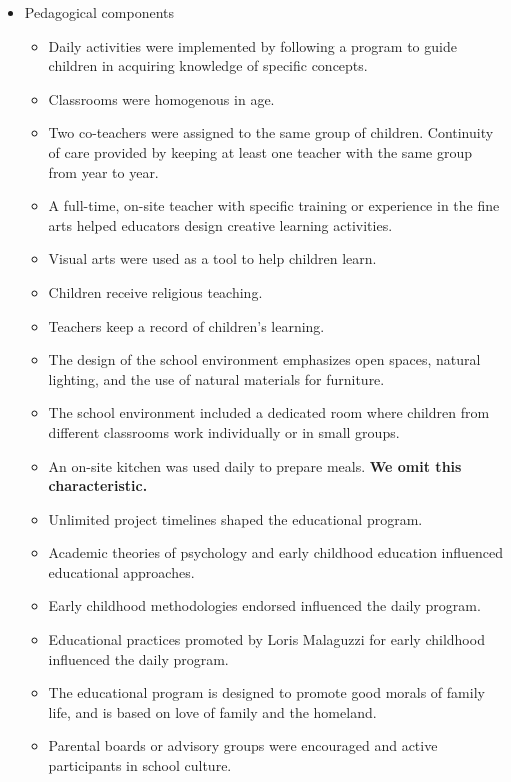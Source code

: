\begin{itemize}
\item Pedagogical components
\begin{itemize}
	\item Daily activities were implemented by following a program to guide children in acquiring knowledge of specific concepts.
	\item Classrooms were homogenous in age.
	\item Two co-teachers were assigned to the same group of children. Continuity of care provided by keeping at least one teacher with the same group from year to year.
	\item A full-time, on-site teacher with specific training or experience in the fine arts helped educators design creative learning activities.
	\item Visual arts were used as a tool to help children learn.
	\item Children receive religious teaching.
	\item Teachers keep a record of children's learning.
	\item The design of the school environment emphasizes open spaces, natural lighting, and the use of natural materials for furniture.
	\item The school environment included a dedicated room where children from different classrooms work individually or in small groups.
	\item An on-site kitchen was used daily to prepare meals. \textbf{We omit this characteristic.}
	\item Unlimited project timelines shaped the educational program.
	\item Academic theories of psychology and early childhood education influenced educational approaches.
	\item Early childhood methodologies endorsed influenced the daily program.
	\item Educational practices promoted by Loris Malaguzzi for early childhood influenced the daily program.
	\item The educational program is designed to promote good morals of family life, and is based on love of family and the homeland.
	\item Parental boards or advisory groups were encouraged and active participants in school culture.
\end{itemize}
\end{itemize}

